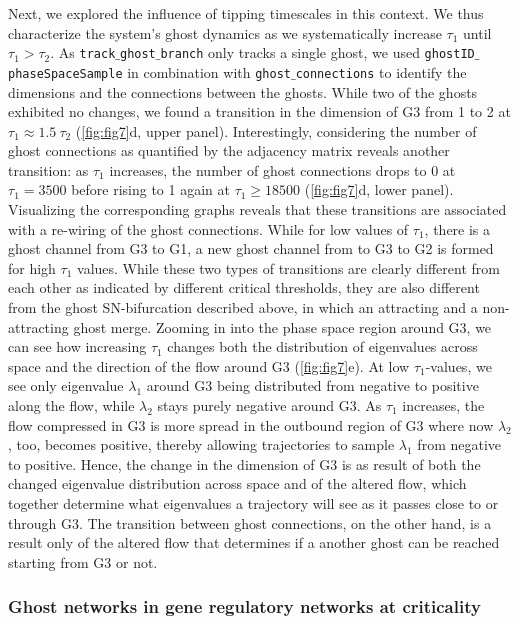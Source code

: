 \documentclass{article}
\theoremstyle{definition}
\begin{document}
\begin{refsection}
Next, we explored the influence of tipping timescales in this context. We thus characterize the system's ghost dynamics as we systematically increase $\tau_1$ until $\tau_1>\tau_2$. As {\tt track$\_$ghost$\_$branch} only tracks a single ghost, we used {\tt ghostID$\_$phaseSpaceSample} in combination with {\tt ghost$\_$connections} to identify the dimensions and the connections between the ghosts. While two of the ghosts exhibited no changes, we found a transition in the dimension of G3 from 1 to 2 at $\tau_1 \approx 1.5\ \tau_2$ (\autoref{fig:fig7}d, upper panel). Interestingly, considering the number of ghost connections as quantified by the adjacency matrix reveals another transition: as $\tau_1$ increases, the number of ghost connections drops to 0 at $\tau_1=3500$ before rising to 1 again at $\tau_1\geq18500$ (\autoref{fig:fig7}d, lower panel). Visualizing the corresponding graphs reveals that these transitions are associated with a re-wiring of the ghost connections. While for low values of $\tau_1$, there is a ghost channel from G3 to G1, a new ghost channel from to G3 to G2 is formed for high $\tau_1$ values. While these two types of transitions are clearly different from each other as indicated by different critical thresholds, they are also different from the ghost SN-bifurcation described above, in which an attracting and a non-attracting ghost merge. Zooming in into the phase space region around G3, we can see how increasing $\tau_1$ changes both the distribution of eigenvalues across space and the direction of the flow around G3 (\autoref{fig:fig7}e). At low $\tau_1$-values, we see only eigenvalue $\lambda_1$ around G3 being distributed from negative to positive along the flow, while $\lambda_2$ stays purely negative around G3. As $\tau_1$ increases, the flow compressed in G3 is more spread in the outbound region of G3 where now $\lambda_2$, too, becomes positive, thereby allowing trajectories to sample $\lambda_1$ from negative to positive.
Hence, the change in the dimension of G3 is as result of both the changed eigenvalue distribution across space and of the altered flow, which together determine what eigenvalues a trajectory will see as it passes close to or through G3. The transition between ghost connections, on the other hand, is a result only of the altered flow that determines if a another ghost can be reached starting from G3 or not. 

\subsubsection{Ghost networks in gene regulatory networks at criticality}


\end{refsection}
\end{document}
